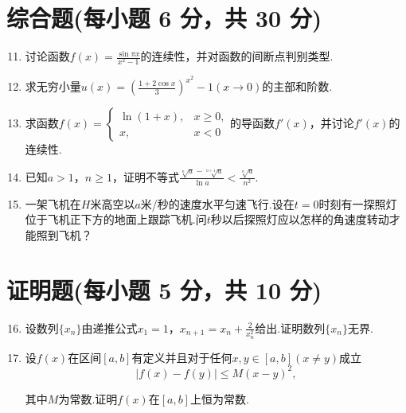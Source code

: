 \documentclass[../main.tex]{subfiles}
\begin{document}
\section{综合题(每小题 6 分，共 30 分)}
\begin{enumerate}
    \setcounter{enumi}{10}
    \item 讨论函数$f(x)=\frac{\sin\pi x}{x^{2}-1}$的连续性，并对函数的间断点判别类型.
          \vspace{8em}

    \item 求无穷小量$u(x)=\left(\frac{1+2\cos x}{3}\right)^{x^2}-1(x\to0)$的主部和阶数.
          \vspace{8em}

    \item 求函数$f(x)=
              \begin{cases}
                  \ln(1+x), & x\geq0, \\
                  x,        & x<0
              \end{cases}$的导函数$f'(x)$，并讨论$f'(x)$的连续性.
          \vspace{9em}

    \item 已知$a>1$，$n\geq1$，证明不等式$\frac{\sqrt[n]{a}-\sqrt[n+1]{a}}{\ln
                  a}<\frac{\sqrt[n]{a}}{n^{2}}$.
          \vspace{10em}

    \item 一架飞机在$H$米高空以$a$米/秒的速度水平匀速飞行.设在$t=0$时刻有一探照灯位于飞机正下方的地面上跟踪飞机.问$t$秒以后探照灯应以怎样的角速度转动才能照到飞机？
          \vspace{12em}
\end{enumerate}

\section{证明题(每小题 5 分，共 10 分)}
\begin{enumerate}
    \setcounter{enumi}{15}
    \item 设数列$\{x_{n}\}$由递推公式$x_{1}=1$，$x_{n+1}=x_{n}+\frac{2}{x_{n}^{2}}$给出.证明数列$\{
              x_{n}\}$无界.
          \vspace{12em}

    \item 设$f(x)$在区间$[a,b]$有定义并且对于任何$x,y\in[a,b](x\neq y)$成立
          \[
              |f(x)-f(y)|\leq M(x-y)^{2},
          \]

          其中$M$为常数.证明$f(x)$在$[a,b]$上恒为常数.
\end{enumerate}
\end{document}
